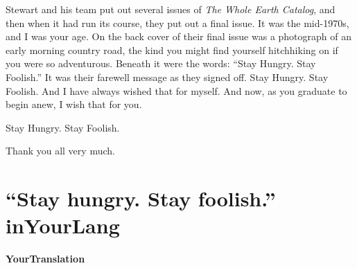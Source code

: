 \documentclass[a4,twocolumn]{article}
\begin{document}
Stewart and his team put out several issues of \textit{The Whole Earth Catalog}, and then when it had run its course, they put out a final issue. It was the mid-1970s, and I was your age. On the back cover of their final issue was a photograph of an early morning country road, the kind you might find yourself hitchhiking on if you were so adventurous. Beneath it were the words: ``Stay Hungry. Stay Foolish.'' It was their farewell message as they signed off. Stay Hungry. Stay Foolish. And I have always wished that for myself. And now, as you graduate to begin anew, I wish that for you.

\vspace{\baselineskip}

Stay Hungry. Stay Foolish.

Thank you all very much.

\newpage

\section*{``Stay hungry. Stay foolish.'' inYourLang}

{\bf YourTranslation}

\newpage

\appendix
\end{document}
